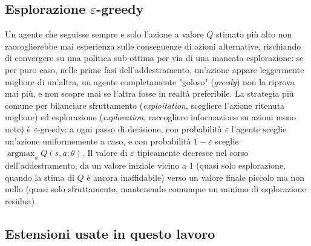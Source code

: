 \subsection{Esplorazione $\varepsilon$-greedy}

Un agente che seguisse sempre e solo l'azione a valore $Q$ stimato più
alto non raccoglierebbe mai esperienza sulle conseguenze di azioni
alternative, rischiando di convergere su una politica sub-ottima per via
di una mancata esplorazione: se per puro caso, nelle prime fasi
dell'addestramento, un'azione appare leggermente migliore di un'altra, un
agente completamente "goloso" (\emph{greedy}) non la riprova mai più, e
non scopre mai se l'altra fosse in realtà preferibile. La strategia più
comune per bilanciare sfruttamento (\emph{exploitation}, scegliere
l'azione ritenuta migliore) ed esplorazione (\emph{exploration},
raccogliere informazione su azioni meno note) è $\varepsilon$-greedy: a
ogni passo di decisione, con probabilità $\varepsilon$ l'agente sceglie
un'azione uniformemente a caso, e con probabilità $1-\varepsilon$ sceglie
$\operatorname*{argmax}_a Q(s,a;\theta)$. Il valore di $\varepsilon$
tipicamente decresce nel corso dell'addestramento, da un valore iniziale
vicino a 1 (quasi solo esplorazione, quando la stima di $Q$ è ancora
inaffidabile) verso un valore finale piccolo ma non nullo (quasi solo
sfruttamento, mantenendo comunque un minimo di esplorazione residua).

\subsection{Estensioni usate in questo lavoro}


